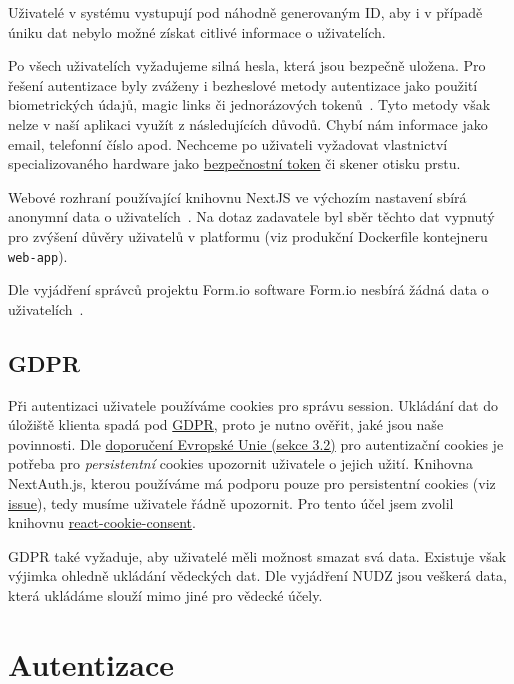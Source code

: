 Uživatelé v systému vystupují pod náhodně generovaným ID, aby i v případě úniku dat nebylo možné získat citlivé informace o uživatelích.

Po všech uživatelích vyžadujeme silná hesla, která jsou bezpečně uložena.
Pro řešení autentizace byly zváženy i bezheslové metody autentizace jako použití biometrických údajů, magic links či jednorázových tokenů~\cite{what-is-passworless}.
Tyto metody však nelze v naší aplikaci využít z následujících důvodů.
Chybí nám informace jako email, telefonní číslo apod.
Nechceme po uživateli vyžadovat vlastnictví specializovaného hardware jako \href{https://cs.wikipedia.org/wiki/Bezpe%C4%8Dnostn%C3%AD_token}{bezpečnostní token} či skener otisku prstu.

Webové rozhraní používající knihovnu NextJS ve výchozím nastavení sbírá anonymní data o uživatelích~\cite{nextjs-telemetry}.
Na dotaz zadavatele byl sběr těchto dat vypnutý pro zvýšení důvěry uživatelů v platformu (viz produkční Dockerfile kontejneru \lstinline{web-app}).

Dle vyjádření správců projektu Form.io software Form.io nesbírá žádná data o uživatelích~\cite{formio-telemetry-issue}.

\subsection{GDPR}\label{subsec:gdpr}

Při autentizaci uživatele používáme cookies pro správu session.
Ukládání dat do úložiště klienta spadá pod \href{https://eur-lex.europa.eu/eli/reg/2016/679/oj}{GDPR}, proto je nutno ověřit, jaké jsou naše povinnosti.
Dle \href{https://ec.europa.eu/justice/article-29/documentation/opinion-recommendation/files/2012/wp194_en.pdf}{doporučení Evropské Unie (sekce 3.2)} pro autentizační cookies je potřeba pro \emph{persistentní} cookies upozornit uživatele o jejich užití.
Knihovna NextAuth.js, kterou používáme má podporu pouze pro persistentní cookies (viz \href{https://github.com/nextauthjs/next-auth/issues/2534}{issue}), tedy musíme uživatele řádně upozornit.
Pro tento účel jsem zvolil knihovnu \href{https://www.npmjs.com/package/react-cookie-consent}{react-cookie-consent}.

GDPR také vyžaduje, aby uživatelé měli možnost smazat svá data.
Existuje však výjimka ohledně ukládání vědeckých dat.
Dle vyjádření NUDZ jsou veškerá data, která ukládáme slouží mimo jiné pro vědecké účely.


\section{Autentizace}\label{sec:auth}

